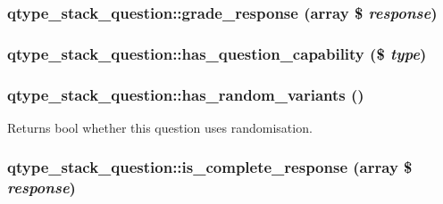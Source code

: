 \label{classqtype__stack__question_a126164aa2828ef593b96a4cc650e64b8}
\hypertarget{classqtype__stack__question_ab5cfd8bc4a6eb7b94f257c1ddc50ad6a}{
\subsubsection[{grade\_\-response}]{\setlength{\rightskip}{0pt plus 5cm}qtype\_\-stack\_\-question::grade\_\-response (array \$ {\em response})}}
\label{classqtype__stack__question_ab5cfd8bc4a6eb7b94f257c1ddc50ad6a}
\hypertarget{classqtype__stack__question_ae1834d8cc6dfb828866475759855aa27}{
\subsubsection[{has\_\-question\_\-capability}]{\setlength{\rightskip}{0pt plus 5cm}qtype\_\-stack\_\-question::has\_\-question\_\-capability (\$ {\em type})}}
\label{classqtype__stack__question_ae1834d8cc6dfb828866475759855aa27}
\hypertarget{classqtype__stack__question_adf9e97e19bbc5ccd7785352469898538}{
\subsubsection[{has\_\-random\_\-variants}]{\setlength{\rightskip}{0pt plus 5cm}qtype\_\-stack\_\-question::has\_\-random\_\-variants ()}}
\label{classqtype__stack__question_adf9e97e19bbc5ccd7785352469898538}
\begin{DoxyReturn}{Returns}
bool whether this question uses randomisation. 
\end{DoxyReturn}
\hypertarget{classqtype__stack__question_ab80c2c47f43a1058c3e161c3f2cf424a}{
\subsubsection[{is\_\-complete\_\-response}]{\setlength{\rightskip}{0pt plus 5cm}qtype\_\-stack\_\-question::is\_\-complete\_\-response (array \$ {\em response})}}
